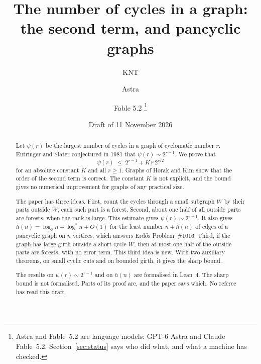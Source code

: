 \documentclass[11pt]{article}
\title{The number of cycles in a graph:\\ the second term, and pancyclic graphs}
\author{KNT \and Astra \and Fable 5.2%
\thanks{Astra and Fable~5.2 are language models: GPT-6 Astra and Claude Fable~5.2.
Section~\ref{sec:status} says who did what, and what a machine has checked.}}
\date{Draft of 11 November 2026}
\theoremstyle{definition}
\theoremstyle{remark}
\numberwithin{equation}{section}
\begin{document}
\maketitle

\begin{abstract}
Let $\psi(r)$ be the largest number of cycles in a graph of cyclomatic number $r$. Entringer and
Slater conjectured in 1981 that $\psi(r)\sim2^{r-1}$. We prove that
\[
  \psi(r)\;\le\;2^{r-1}+K\,r\,2^{r/2}
\]
for an absolute constant $K$ and all $r\ge1$. Graphs of Horak and Kim show that the order of the
second term is correct. The constant $K$ is not explicit, and the bound gives no numerical
improvement for graphs of any practical size.

The paper has three ideas. First, count the cycles through a small subgraph $W$ by their parts
outside $W$; each such part is a forest. Second, about one half of all outside parts are forests,
when the rank is large. This estimate gives $\psi(r)\sim2^{r-1}$. It also gives
$h(n)=\log_2n+\log^{*}n+O(1)$ for the least number $n+h(n)$ of edges of a pancyclic graph on $n$
vertices, which answers Erd\H{o}s Problem~\#1016. Third, if the graph has large girth outside a
short cycle $W$, then at most one half of the outside parts are forests, with no error term. This
third idea is new. With two auxiliary theorems, on small cyclic cuts and on bounded girth, it gives
the sharp bound.

The results on $\psi(r)\sim2^{r-1}$ and on $h(n)$ are formalised in Lean~4. The sharp bound is not
formalised. Parts of its proof are, and the paper says which. No referee has read this draft.
\end{abstract}


















\appendix



\end{document}
